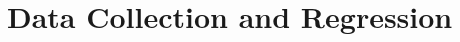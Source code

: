 \documentclass[../../main.tex]{subfiles}
\begin{document}
\chapter{Data Collection and Regression}
\end{document}

